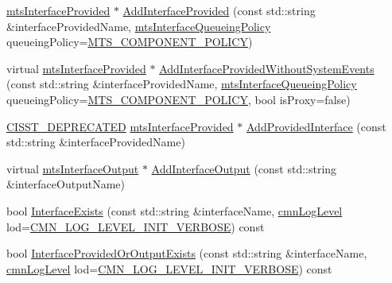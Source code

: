 \begin{DoxyCompactItemize}
\hyperlink{classmts_interface_provided}{mts\+Interface\+Provided} $\ast$ \hyperlink{classmts_component_a99011569c5c9bb52a6abc0e068a89cc5}{Add\+Interface\+Provided} (const std\+::string \&interface\+Provided\+Name, \hyperlink{mts_forward_declarations_8h_abedfb5c45b329a89b0fb647a96a7c938}{mts\+Interface\+Queueing\+Policy} queueing\+Policy=\hyperlink{mts_forward_declarations_8h_abedfb5c45b329a89b0fb647a96a7c938aff70a768b1fb65f10206583efbad12bb}{M\+T\+S\+\_\+\+C\+O\+M\+P\+O\+N\+E\+N\+T\+\_\+\+P\+O\+L\+I\+C\+Y})
\item 
virtual \hyperlink{classmts_interface_provided}{mts\+Interface\+Provided} $\ast$ \hyperlink{classmts_component_a06de220ed3ff629565ec27fded349d81}{Add\+Interface\+Provided\+Without\+System\+Events} (const std\+::string \&interface\+Provided\+Name, \hyperlink{mts_forward_declarations_8h_abedfb5c45b329a89b0fb647a96a7c938}{mts\+Interface\+Queueing\+Policy} queueing\+Policy=\hyperlink{mts_forward_declarations_8h_abedfb5c45b329a89b0fb647a96a7c938aff70a768b1fb65f10206583efbad12bb}{M\+T\+S\+\_\+\+C\+O\+M\+P\+O\+N\+E\+N\+T\+\_\+\+P\+O\+L\+I\+C\+Y}, bool is\+Proxy=false)
\item 
\hyperlink{cmn_portability_8h_a63da7164735f9501be651b1f2bbc0121}{C\+I\+S\+S\+T\+\_\+\+D\+E\+P\+R\+E\+C\+A\+T\+E\+D} \hyperlink{classmts_interface_provided}{mts\+Interface\+Provided} $\ast$ \hyperlink{classmts_component_af2be5e127e81a607564ea3f05b20c6e1}{Add\+Provided\+Interface} (const std\+::string \&interface\+Provided\+Name)
\item 
virtual \hyperlink{classmts_interface_output}{mts\+Interface\+Output} $\ast$ \hyperlink{classmts_component_a88a3def4ceb33630f635ca67df5b6161}{Add\+Interface\+Output} (const std\+::string \&interface\+Output\+Name)
\item 
bool \hyperlink{classmts_component_ad3c9033d9f370336da54739d6feaa959}{Interface\+Exists} (const std\+::string \&interface\+Name, \hyperlink{cmn_log_lo_d_8h_a70c67165c37a0971e0dd1a85d4edaaae}{cmn\+Log\+Level} lod=\hyperlink{cmn_log_lo_d_8h_ae0fcf22a2f3faaba0c5bf49a237e3f3e}{C\+M\+N\+\_\+\+L\+O\+G\+\_\+\+L\+E\+V\+E\+L\+\_\+\+I\+N\+I\+T\+\_\+\+V\+E\+R\+B\+O\+S\+E}) const 
\item 
bool \hyperlink{classmts_component_a76cc436dda8a33914299ec5db7e3cace}{Interface\+Provided\+Or\+Output\+Exists} (const std\+::string \&interface\+Name, \hyperlink{cmn_log_lo_d_8h_a70c67165c37a0971e0dd1a85d4edaaae}{cmn\+Log\+Level} lod=\hyperlink{cmn_log_lo_d_8h_ae0fcf22a2f3faaba0c5bf49a237e3f3e}{C\+M\+N\+\_\+\+L\+O\+G\+\_\+\+L\+E\+V\+E\+L\+\_\+\+I\+N\+I\+T\+\_\+\+V\+E\+R\+B\+O\+S\+E}) const 

\end{DoxyCompactItemize}
